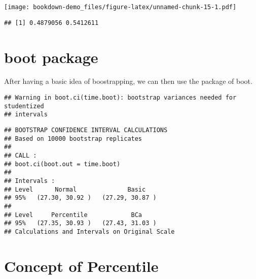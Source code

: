 \documentclass[]{book}
\newenvironment{Shaded}{\begin{snugshade}}{\end{snugshade}}
\newcommand{\ControlFlowTok}[1]{\textcolor[rgb]{0.13,0.29,0.53}{\textbf{#1}}}
\newcommand{\DecValTok}[1]{\textcolor[rgb]{0.00,0.00,0.81}{#1}}
\newcommand{\KeywordTok}[1]{\textcolor[rgb]{0.13,0.29,0.53}{\textbf{#1}}}
\newcommand{\NormalTok}[1]{#1}
\newcommand{\OperatorTok}[1]{\textcolor[rgb]{0.81,0.36,0.00}{\textbf{#1}}}
\newcommand{\StringTok}[1]{\textcolor[rgb]{0.31,0.60,0.02}{#1}}
\begin{document}
\texttt{[image: bookdown-demo\_files/figure-latex/unnamed-chunk-15-1.pdf]}

\begin{verbatim}
## [1] 0.4879056 0.5412611
\end{verbatim}

\hypertarget{boot-package}{%
\section{boot package}\label{boot-package}}

After having a basic idea of boostrapping, we can then use the package of boot.

\begin{Shaded}
\end{Shaded}

\begin{verbatim}
## Warning in boot.ci(time.boot): bootstrap variances needed for studentized
## intervals
\end{verbatim}

\begin{verbatim}
## BOOTSTRAP CONFIDENCE INTERVAL CALCULATIONS
## Based on 10000 bootstrap replicates
## 
## CALL : 
## boot.ci(boot.out = time.boot)
## 
## Intervals : 
## Level      Normal              Basic         
## 95%   (27.30, 30.92 )   (27.29, 30.87 )  
## 
## Level     Percentile            BCa          
## 95%   (27.35, 30.93 )   (27.43, 31.03 )  
## Calculations and Intervals on Original Scale
\end{verbatim}

\hypertarget{concept-of-percentile}{%
\section{Concept of Percentile}\label{concept-of-percentile}}
\end{document}
